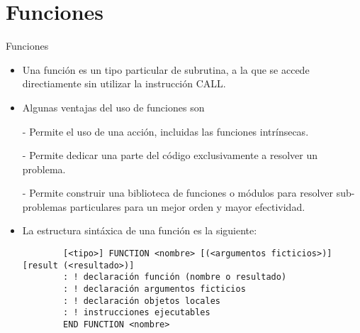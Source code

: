 
\section{Funciones}  



\begin{frame}[fragile]{Funciones}
 \begin{itemize}[<+(0)->]
  \item Una función es un tipo particular de subrutina, a la que se accede directiamente sin utilizar la instrucción CALL.
  \item Algunas ventajas del uso de funciones son
  \item [-]Permite el uso de una acción, incluidas las funciones intrínsecas.
  \item [-]Permite dedicar una parte del código exclusivamente a resolver un problema.
  \item [-]Permite construir una biblioteca de funciones o módulos para resolver sub-problemas particulares para un mejor orden y mayor efectividad. 
  \item La estructura sintáxica de una función es la siguiente:
    \vspace{0.1cm}
        \begin{verbatim}
        [<tipo>] FUNCTION <nombre> [(<argumentos ficticios>)] [result (<resultado>)]
        : ! declaración función (nombre o resultado)
        : ! declaración argumentos ficticios
        : ! declaración objetos locales
        : ! instrucciones ejecutables
        END FUNCTION <nombre>
        \end{verbatim}
 \end{itemize}
\end{frame}

